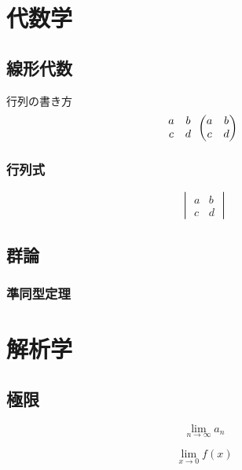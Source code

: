\documentclass[11pt,a4j]{jreport}
\begin{document}
\chapter{代数学}
\thispagestyle{fancy}
\section{線形代数}
行列の書き方\\
\[
\begin{matrix}
    a & b \\
    c & d
\end{matrix}\\
\begin{pmatrix}
    a & b \\
    c & d
\end{pmatrix}\\
\]
\subsection{行列式}
\[
\begin{vmatrix}
    a & b \\
    c & d
\end{vmatrix}
\]

\section{群論}
\subsection{準同型定理}


\chapter{解析学}
\thispagestyle{fancy}
\section{極限}
\[
\lim_{n\to\infty}a_{n}
\]

\[
\lim_{x\to0}f(x)
\]
\end{document}
